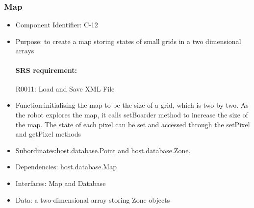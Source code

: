 \documentclass[11pt, a4paper]{report}
\begin{document}
\subsubsection{Map}
\begin{itemize}
\item Component Identifier: C-12
\item Purpose: to create a map storing states of small grids in a two dimensional arrays
\paragraph{SRS requirement:} R0011: Load and Save XML File
\item Function:initialising the map to be the size of a grid, which is two by two. As the robot
 explores the map, it calls setBoarder method to increase the size of the map. The state of each
 pixel can be set and accessed through the setPixel and getPixel methods

\item Subordinates:host.database.Point and host.database.Zone.
\item Dependencies: host.database.Map
\item Interfaces: Map and Database
\item Data: a two-dimensional array storing Zone objects
\end{itemize}

\end{document}
